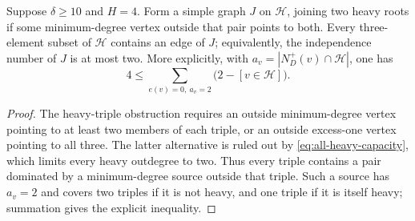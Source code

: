 \begin{corollary}
\label{cor:four-heavy-minimum-pairs}
Suppose $\delta\ge10$ and $H=4$.  Form a simple graph $J$ on
$\mathcal H$, joining two heavy roots if some minimum-degree
vertex outside that pair points to both.  Every three-element
subset of $\mathcal H$ contains an edge of $J$; equivalently,
the independence number of $J$ is at most two.
More explicitly, with
$a_v=|N_D^+(v)\cap\mathcal H|$, one has
\[
 4\le\sum_{e(v)=0,\ a_v=2}\bigl(2-[v\in\mathcal H]\bigr).
\]
\end{corollary}
\begin{proof}
The heavy-triple obstruction requires an outside minimum-degree
vertex pointing to at least two members of each triple, or an
outside excess-one vertex pointing to all three.
The latter alternative is ruled out by
\eqref{eq:all-heavy-capacity}, which limits every heavy outdegree
to two.  Thus every triple contains a pair dominated by a
minimum-degree source outside that triple.
Such a source has $a_v=2$ and covers two triples if it is not
heavy, and one triple if it is itself heavy; summation gives
the explicit inequality.
\end{proof}
